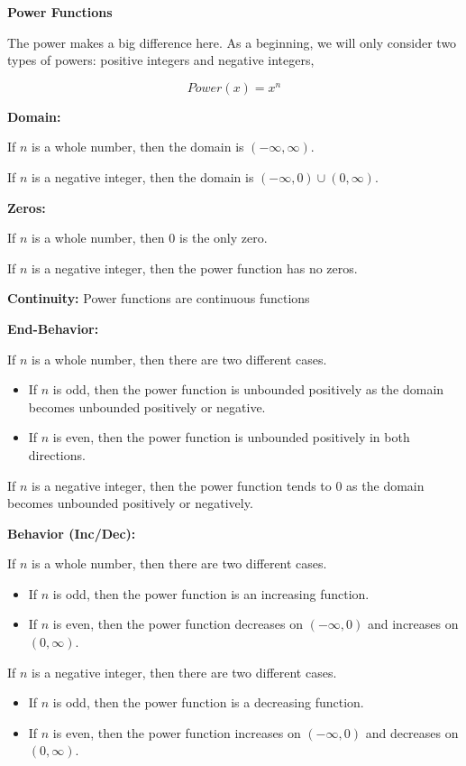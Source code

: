 \documentclass{ximera}
\begin{document}
\begin{explanation} \textbf{\textcolor{red!75!green}{Power Functions}} 


The power makes a big difference here.  As a beginning, we will only consider two types of powers: positive integers and negative integers,


\[ Power(x) = x^n  \]


\textbf{Domain:} 

If $n$ is a whole number, then the domain is $(-\infty, \infty)$.

If $n$ is a negative integer, then the domain is $(-\infty, 0) \cup (0, \infty)$.


\textbf{Zeros:} 

If $n$ is a whole number, then $0$ is the only zero.

If $n$ is a negative integer, then the power function has no zeros.


\textbf{Continuity:} Power functions are continuous functions

\textbf{End-Behavior:} 

If $n$ is a whole number, then there are two different cases.

\begin{itemize}
\item If $n$ is odd, then the power function is unbounded positively as the domain becomes unbounded positively or negative.
\item If $n$ is even, then the power function is unbounded positively in both directions.
\end{itemize}

If $n$ is a negative integer, then the power function tends to $0$ as the domain becomes unbounded positively or negatively.



\textbf{Behavior (Inc/Dec):} 

If $n$ is a whole number, then there are two different cases.

\begin{itemize}
\item If $n$ is odd, then the power function is an increasing function.
\item If $n$ is even, then the power function decreases on $(-\infty, 0)$ and increases on $(0, \infty)$.
\end{itemize}

If $n$ is a negative integer, then there are two different cases.

\begin{itemize}
\item If $n$ is odd, then the power function is a decreasing function.
\item If $n$ is even, then the power function increases on $(-\infty, 0)$ and decreases on $(0, \infty)$.
\end{itemize}




\end{explanation}
\end{document}
